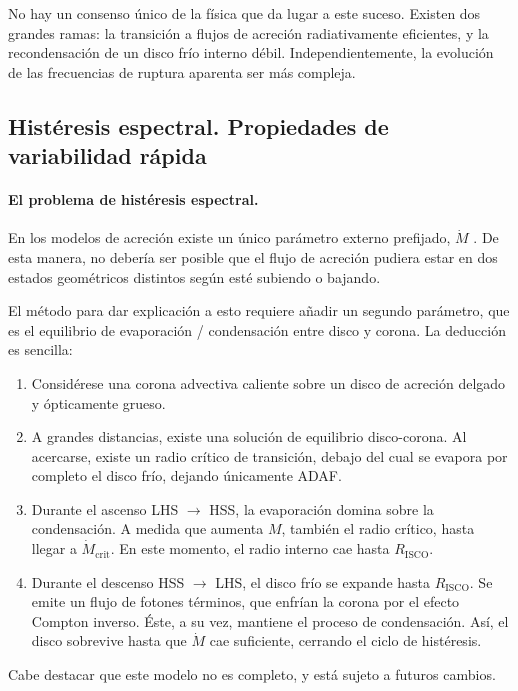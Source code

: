 \noindent No hay un consenso único de la física que da lugar a este suceso. Existen dos grandes ramas: la transición a flujos de acreción radiativamente eficientes, y la recondensación de un disco frío interno débil. Independientemente, la evolución de las frecuencias de ruptura aparenta ser más compleja. 


\subsection{Histéresis espectral. Propiedades de variabilidad rápida}

\paragraph{El problema de histéresis espectral.} En los modelos de acreción existe un único parámetro externo prefijado, $\dot{M}$ \cite{malzac}. De esta manera, no debería ser posible que el flujo de acreción pudiera estar en dos estados geométricos distintos según esté subiendo o bajando. 

El método para dar explicación a esto requiere añadir un segundo parámetro, que es el equilibrio de evaporación / condensación entre disco y corona. La deducción es sencilla:

\begin{enumerate}
    \item Considérese una corona advectiva caliente sobre un disco de acreción delgado y ópticamente grueso.
    \item A grandes distancias, existe una solución de equilibrio disco-corona. Al acercarse, existe un radio crítico de transición, debajo del cual se evapora por completo el disco frío, dejando únicamente ADAF.
    \item Durante el ascenso LHS $\to$ HSS, la evaporación domina sobre la condensación. A medida que aumenta $M$, también el radio crítico, hasta llegar a $\dot{M}_{\mbox{crit}}$. En este momento, el radio interno cae hasta $R_{\mbox{ISCO}}$.
    \item Durante el descenso HSS $\to$ LHS, el disco frío se expande hasta $R_{\mbox{ISCO}}$. Se emite un flujo de fotones términos, que enfrían la corona por el efecto Compton inverso. Éste, a su vez, mantiene el proceso de condensación. Así, el disco sobrevive hasta que $\dot{M}$ cae suficiente, cerrando el ciclo de histéresis.
\end{enumerate}

\noindent Cabe destacar que este modelo no es completo, y está sujeto a futuros cambios.

